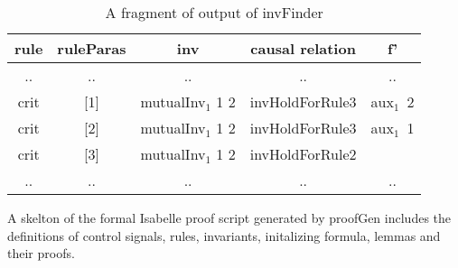 \documentclass{llncs}
\begin{document}
 \begin{table}[!t]
\centering \caption{A fragment of output of {\sf invFinder}}\label{label-ground-causal relation} %
\begin{tabular}{|c|c|c|c|c|  }
\hline
  rule& ruleParas&inv&causal relation &   f'  \\
\hline
  .. & ..&.. &..&.. \\

\hline
  crit  & [1]& mutualInv$_1$ 1 2& invHoldForRule3 &aux$_1$~2 \\
\hline
  crit &[2]& mutualInv$_1$ 1 2& invHoldForRule3 &aux$_1$~1  \\
\hline
  crit & [3]& mutualInv$_1$ 1 2 & invHoldForRule2  & \\
\hline
  .. & ..&.. &..&.. \\
\hline
\end{tabular}
\end{table}

A skelton of the formal Isabelle proof script generated by {\sf proofGen}
includes the definitions of control signals, rules, invariants, initalizing formula,
lemmas and their proofs. %
\end{document}
